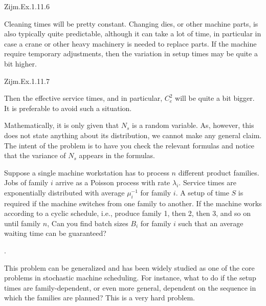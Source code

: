 \begin{question}
Zijm.Ex.1.11.6
 \begin{solution}
   Cleaning times will be pretty constant. Changing dies, or other
   machine parts, is also typically quite predictable, although it can
   take a lot of time, in particular in case a crane or other heavy
   machinery is needed to replace parts. If the machine require
   temporary adjustments, then the variation in setup times may be
   quite a bit higher.
\end{solution}
\end{question}

\begin{question}
Zijm.Ex.1.11.7
 \begin{solution}
   Then the effective service times, and in particular, $C_e^2$ will
   be quite a bit bigger. It is preferable to avoid such a situation. 

   Mathematically, it is only given that $N_s$ is a random
   variable. As, however, this does not state anything about its
   distribution, we cannot make any general claim. The intent of the
   problem is to have you check the relevant formulas and notice that
   the variance of $N_s$ appears in the formulas.
\end{solution}
\end{question}

\begin{question}[use=false]
  Suppose a single machine workstation has to process $n$ different
  product families. Jobs of family $i$ arrive as a Poisson process
  with rate $\lambda_i$.  Service times are exponentially distributed
  with average $\mu_i^{-1}$ for family $i$. A setup of time $S$ is
  required if the machine switches from one family to another. If the
  machine works according to a cyclic schedule, i.e., produce family
  1, then 2, then 3, and so on until family $n$, Can you find batch
  sizes $B_i$ for family $i$ such that an average waiting time can be
  guaranteed?
  \begin{solution}
    \TBD. 

    This problem can be generalized and has been widely studied as one
    of the core problems in stochastic machine scheduling. For
    instance, what to do if the setup times are family-dependent, or
    even more general, dependent on the sequence in which the families
    are planned? This is a very hard problem. 
  \end{solution}
\end{question}

